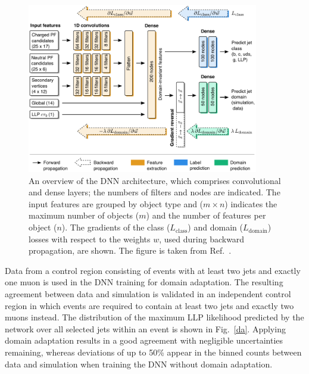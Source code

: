 \documentclass{webofc}
\begin{document}
\begin{figure}[!ht]
\includegraphics[width=0.9\textwidth]{figs/network.pdf}
\centering
\caption{An overview of the DNN architecture, which comprises convolutional and dense layers; the numbers of filters and nodes are indicated. The input features are grouped by object type and ($m\times n$) indicates the maximum number of objects ($m$) and the number of features per object ($n$). The gradients of the class ($L_\textrm{class}$) and domain ($L_\textrm{domain}$) losses with respect to the weights $w$, used during backward propagation, are shown. The figure is taken from Ref.~\cite{CMS-EXO-19-011}.}
\label{arch}
\end{figure}

Data from a control region consisting of events with at least two jets and exactly one muon is used in the DNN training for domain adaptation. The resulting agreement between data and simulation is validated in an independent control region in which events are required to contain at least two jets and exactly two muons instead. The distribution of the maximum LLP likelihood predicted by the network over all selected jets within an event is shown in Fig.~\ref{da}. Applying domain adaptation results in a good agreement with negligible uncertainties remaining, whereas deviations of up to 50\% appear in the binned counts between data and simulation when training the DNN without domain adaptation.
\end{document}
